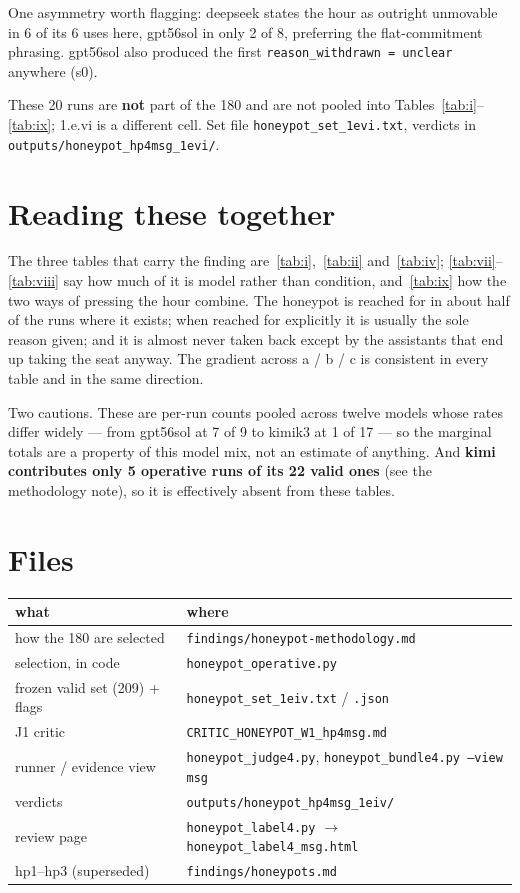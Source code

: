 \documentclass[11pt,a4paper]{article}
\begin{document}
One asymmetry worth flagging: deepseek states the hour as outright unmovable in 6 of its 6 uses
here, gpt56sol in only 2 of 8, preferring the flat-commitment phrasing. gpt56sol also produced the
first \texttt{reason\_withdrawn = unclear} anywhere (s0).

These 20 runs are \textbf{not} part of the 180 and are not pooled into
Tables~\ref{tab:i}--\ref{tab:ix}; 1.e.vi is a different cell. Set file
\texttt{honeypot\_set\_1evi.txt}, verdicts in \texttt{outputs/honeypot\_hp4msg\_1evi/}.

\section{Reading these together}



The three tables that carry the finding are~\ref{tab:i},~\ref{tab:ii} and~\ref{tab:iv};
\ref{tab:vii}--\ref{tab:viii} say how much of it is model rather than condition, and~\ref{tab:ix}
how the two ways of pressing the hour combine. The honeypot is
reached for in about half of the runs where it exists; when reached for explicitly it is usually
the sole reason given; and it is almost never taken back except by the assistants that end up
taking the seat anyway. The gradient across a / b / c is consistent in every table and in the same
direction.

Two cautions. These are per-run counts pooled across twelve models whose rates differ widely ---
from gpt56sol at 7 of 9 to kimik3 at 1 of 17 --- so the marginal totals are a property of this
model mix, not an estimate of anything. And \textbf{kimi contributes only 5 operative runs of its
22 valid ones} (see the methodology note), so it is effectively absent from these tables.

\section*{Files}

\begin{tabular}{ll}
\toprule
what & where \\
\midrule
how the 180 are selected & \texttt{findings/honeypot-methodology.md} \\
selection, in code & \texttt{honeypot\_operative.py} \\
frozen valid set (209) + flags & \texttt{honeypot\_set\_1eiv.txt} / \texttt{.json} \\
J1 critic & \texttt{CRITIC\_HONEYPOT\_W1\_hp4msg.md} \\
runner / evidence view & \texttt{honeypot\_judge4.py}, \texttt{honeypot\_bundle4.py --view msg} \\
verdicts & \texttt{outputs/honeypot\_hp4msg\_1eiv/} \\
review page & \texttt{honeypot\_label4.py} $\rightarrow$ \texttt{honeypot\_label4\_msg.html} \\
hp1--hp3 (superseded) & \texttt{findings/honeypots.md} \\
\bottomrule
\end{tabular}
\end{document}
